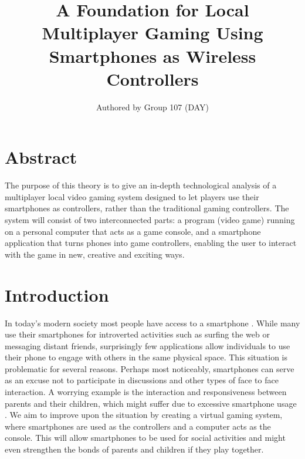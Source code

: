 \documentclass{article}
\title{A Foundation for Local Multiplayer Gaming Using Smartphones as Wireless Controllers}
\author{Authored by Group 107 (DAY)}
\date{}
\begin{document}
\maketitle
\section{Abstract}
The purpose of this theory is to give an in-depth technological analysis of a multiplayer local video gaming system designed to let players use their smartphones as controllers, rather than the traditional gaming controllers. The system will consist of two interconnected parts: a program (video game) running on a personal computer that acts as a game console, and a smartphone application that turns phones into game controllers, enabling the user to interact with the game in new, creative and exciting ways.


\section{Introduction}
In today's modern society most people have access to a smartphone \cite{key:1}. While many use their
smartphones for introverted activities such as surfing the web or messaging distant friends,
surprisingly few applications allow individuals to use their phone to engage with others in the
same physical space.
This situation is problematic for several reasons. Perhaps most noticeably, smartphones can serve
as an excuse not to participate in discussions and other types of face to face interaction. A
worrying example is the interaction and responsiveness between parents and their children,
which might suffer due to excessive smartphone usage \cite{key:2}. We aim to improve upon the situation
by creating a virtual gaming system, where smartphones are used as the controllers and a
computer acts as the console. This will allow smartphones to be used for social activities and
might even strengthen the bonds of parents and children if they play together.
\end{document}
